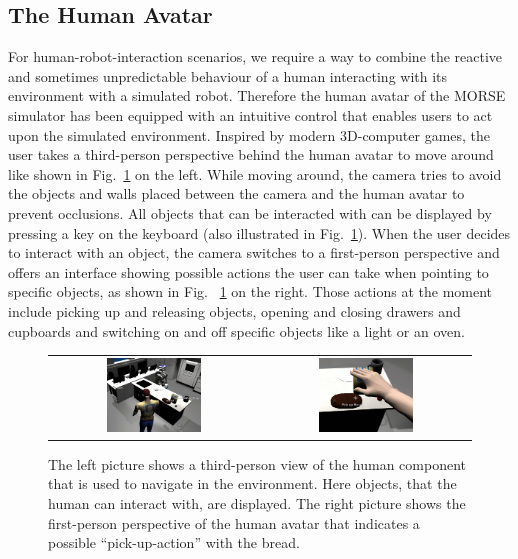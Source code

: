 \documentclass{llncs}
\begin{document}
\subsection{The Human Avatar}
\label{section:human}

For human-robot-interaction scenarios, we require a way to combine the
reactive and sometimes unpredictable behaviour of a human interacting with its
environment with a simulated robot. Therefore the human avatar of the MORSE
simulator has been equipped with an intuitive control that enables users to act
upon the simulated environment. Inspired by modern 3D-computer games, the user
takes a third-person perspective behind the human avatar to move around like
shown in Fig.~\ref{fig:human_control} on the left.
While moving around, the camera tries to avoid the objects and walls placed
between the camera and the human avatar to prevent occlusions.  All objects
that can be interacted with can be displayed by pressing a key on the
keyboard (also illustrated in Fig.~\ref{fig:human_control}). When the user
decides to interact with an object, the camera switches to a first-person
perspective and offers an interface showing possible actions the
user can take when pointing to specific objects, as shown in Fig.~
\ref{fig:human_control} on the right. Those actions at the moment include
picking up and releasing objects, opening and closing drawers and cupboards and
switching on and off specific objects like a light or an oven.

\begin{figure}[ht!]
\centering
\begin{tabular}{cc}
 \includegraphics[width=0.475\textwidth]{pics/human_control_1.png} &
 \includegraphics[width=0.475\textwidth]{pics/human_control_2.png}
\end{tabular}
\caption{The left picture shows a third-person view of the human component that
    is used to navigate in the environment. Here objects, that the human can
    interact with, are displayed. The right picture shows the first-person
    perspective of the human avatar that indicates a possible
    ``pick-up-action'' with the bread.}
\label{fig:human_control}
\end{figure}
\end{document}
